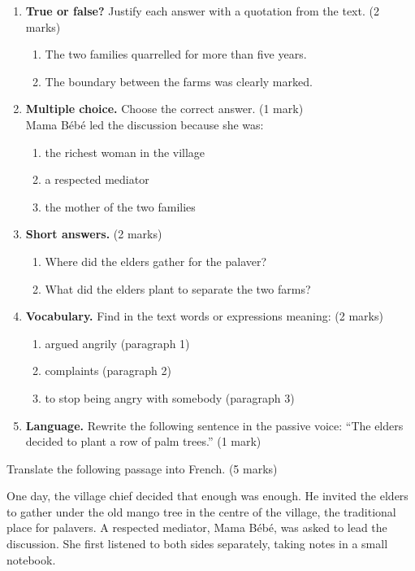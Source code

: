 \documentclass[11pt]{article}
\begin{document}
\begin{exercice}
\begin{enumerate}
\item \textbf{True or false?} Justify each answer with a quotation from the text. (2 marks)
\begin{enumerate}
\item The two families quarrelled for more than five years.
\item The boundary between the farms was clearly marked.
\end{enumerate}
\item \textbf{Multiple choice.} Choose the correct answer. (1 mark)\\
Mama Bébé led the discussion because she was:
\begin{enumerate}
\item the richest woman in the village
\item a respected mediator
\item the mother of the two families
\end{enumerate}
\item \textbf{Short answers.} (2 marks)
\begin{enumerate}
\item Where did the elders gather for the palaver?
\item What did the elders plant to separate the two farms?
\end{enumerate}
\item \textbf{Vocabulary.} Find in the text words or expressions meaning: (2 marks)
\begin{enumerate}
\item argued angrily (paragraph 1)
\item complaints (paragraph 2)
\item to stop being angry with somebody (paragraph 3)
\end{enumerate}
\item \textbf{Language.} Rewrite the following sentence in the passive voice: “The elders decided to plant a row of palm trees.” (1 mark)
\end{enumerate}
\end{exercice}

\begin{exercice}
Translate the following passage into French. (5 marks)

\begin{textebox}
One day, the village chief decided that enough was enough. He invited the elders to gather under the old mango tree in the centre of the village, the traditional place for palavers. A respected mediator, Mama Bébé, was asked to lead the discussion. She first listened to both sides separately, taking notes in a small notebook.
\end{textebox}
\end{exercice}
\end{document}
